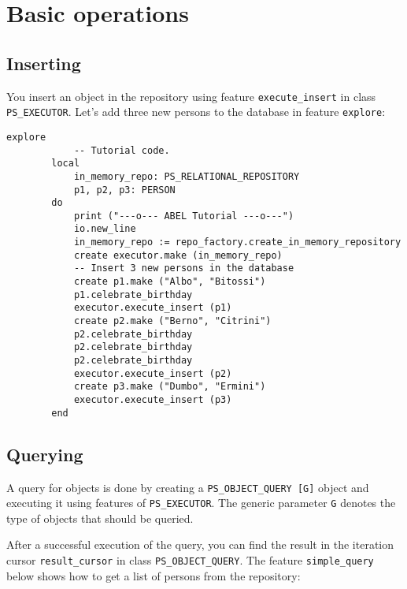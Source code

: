 \documentclass[a4paper,12pt]{report}
\begin{document}
\chapter{Basic operations}

\section{Inserting}

You insert an object in the repository using feature \lstinline{execute_insert} in class\\ 
\lstinline{PS_EXECUTOR}. Let's add three new persons to the database in feature \lstinline{explore}:
\begin{lstlisting}[language=OOSC2Eiffel, captionpos=b, caption={Insertion code.}, label={lst:tutorial_insert}]
	explore
			-- Tutorial code.
		local
			in_memory_repo: PS_RELATIONAL_REPOSITORY
			p1, p2, p3: PERSON
		do
			print ("---o--- ABEL Tutorial ---o---")
			io.new_line
			in_memory_repo := repo_factory.create_in_memory_repository
			create executor.make (in_memory_repo)
			-- Insert 3 new persons in the database
			create p1.make ("Albo", "Bitossi")
			p1.celebrate_birthday
			executor.execute_insert (p1)
			create p2.make ("Berno", "Citrini")
			p2.celebrate_birthday
			p2.celebrate_birthday
			p2.celebrate_birthday
			executor.execute_insert (p2)
			create p3.make ("Dumbo", "Ermini")
			executor.execute_insert (p3)			
		end
\end{lstlisting}

\section{Querying}
\label{section:querying}
A query for objects is done by creating a \lstinline!PS_OBJECT_QUERY [G]! object and executing it using features of \lstinline!PS_EXECUTOR!.
The generic parameter \lstinline!G! denotes the type of objects that should be queried.

After a successful execution of the query, you can find the result in the iteration cursor \lstinline{result_cursor} in class \lstinline{PS_OBJECT_QUERY}. The feature \lstinline{simple_query} below shows how to get a list of persons from the repository:
\end{document}
